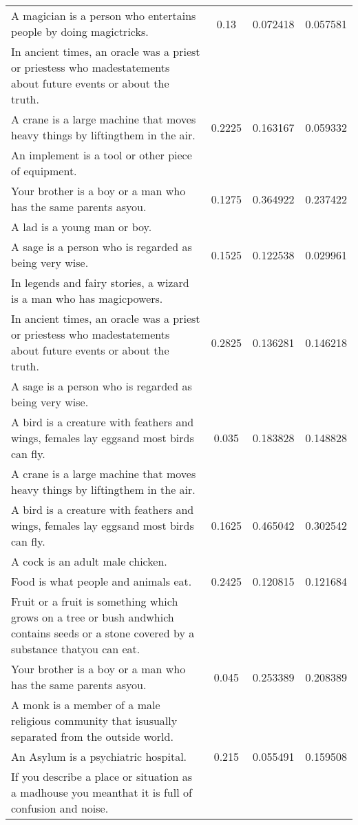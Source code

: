 \begin{center}
{\begin{longtable}{|p{9cm}|c|c|c|}
\hline
A magician is a person who entertains people by doing magictricks. & 0.13 & 0.072418 & 0.057581 \\
In ancient times, an oracle was a priest or priestess who madestatements about future events or about the truth. & & & \\
\hline
A crane is a large machine that moves heavy things by liftingthem in the air. & 0.2225 & 0.163167 & 0.059332 \\
An implement is a tool or other piece of equipment. & & & \\
\hline
Your brother is a boy or a man who has the same parents asyou. & 0.1275 & 0.364922 & 0.237422 \\
A lad is a young man or boy. & & & \\
\hline
A sage is a person who is regarded as being very wise. & 0.1525 & 0.122538 & 0.029961 \\
In legends and fairy stories, a wizard is a man who has magicpowers. & & & \\
\hline
In ancient times, an oracle was a priest or priestess who madestatements about future events or about the truth. & 0.2825 & 0.136281 & 0.146218 \\
A sage is a person who is regarded as being very wise. & & & \\
\hline
A bird is a creature with feathers and wings, females lay eggsand most birds can fly. & 0.035 & 0.183828 & 0.148828 \\
A crane is a large machine that moves heavy things by liftingthem in the air. & & & \\
\hline
A bird is a creature with feathers and wings, females lay eggsand most birds can fly. & 0.1625 & 0.465042 & 0.302542 \\
A cock is an adult male chicken. & & & \\
\hline
Food is what people and animals eat. & 0.2425 & 0.120815 & 0.121684 \\
Fruit or a fruit is something which grows on a tree or bush andwhich contains seeds or a stone covered by a substance thatyou can eat. & & & \\
\hline
Your brother is a boy or a man who has the same parents asyou. & 0.045 & 0.253389 & 0.208389 \\
A monk is a member of a male religious community that isusually separated from the outside world. & & & \\
\hline
An Asylum is a psychiatric hospital. & 0.215 & 0.055491 & 0.159508 \\
If you describe a place or situation as a madhouse you meanthat it is full of confusion and noise. & & & \\

\end{longtable}}
\end{center}
